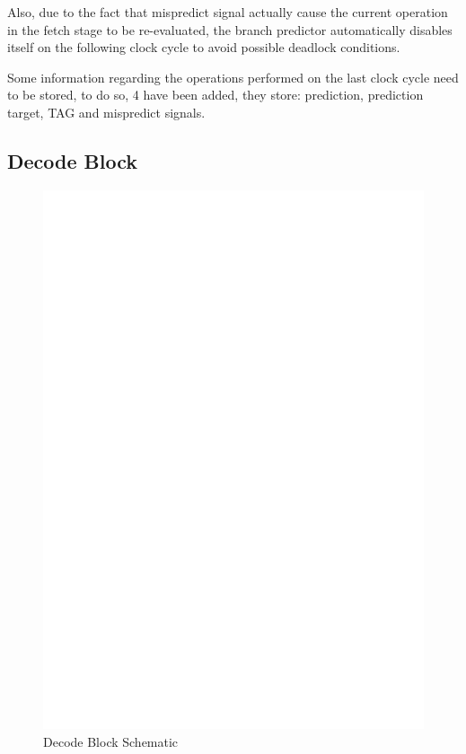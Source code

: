 \documentclass[12pt]{article}
\begin{document}
Also, due to the fact that mispredict signal actually cause the current operation in the fetch stage to be re-evaluated, the branch predictor automatically disables itself on the following clock cycle to avoid possible deadlock conditions.

Some information regarding the operations performed on the last clock cycle need to be stored, to do so, 4 have been added, they store: prediction, prediction target, TAG and mispredict signals.

\subsection{Decode Block}
\begin{figure}[h!]
	\includegraphics[width=\textwidth, center]{images/DECODE_BLOCK.eps}
	\caption{Decode Block Schematic}
	\label{DECODEBLOCK}
\end{figure}
\end{document}
